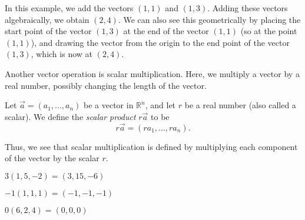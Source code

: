 \documentclass{ximera}
\begin{document}
\begin{example}
In this example, we add the vectors $(1,1)$ and $(1,3)$. Adding these vectors algebraically, we obtain $(2,4)$. We can also see this geometrically by placing the start point of the vector $(1,3)$ at the end of the vector $(1,1)$ (so at the point $(1,1)$), and drawing the vector from the origin to the end point of the vector $(1,3)$, which is now at $(2,4)$.

\begin{image}
\end{image}
\end{example}

Another vector operation is scalar multiplication. Here, we multiply a vector by a real number, possibly changing the length of the vector.

\begin{definition}
Let $\vec{a}=(a_1,...,a_n)$ be a vector in $\mathbb{R}^n$, and let $r$ be a real number (also called a scalar). We define the \emph{scalar product} $r\vec{a}$ to be
\[
r\vec{a} = (ra_1,...,ra_n).
\]
\end{definition}

Thus, we see that scalar multiplication is defined by multiplying each component of the vector by the scalar $r$.

\begin{example}
$3(1,5,-2)=(3,15,-6)$

$-1(1,1,1)=(-1,-1,-1)$

$0(6,2,4) = (0,0,0)$
\end{example}
\end{document}
